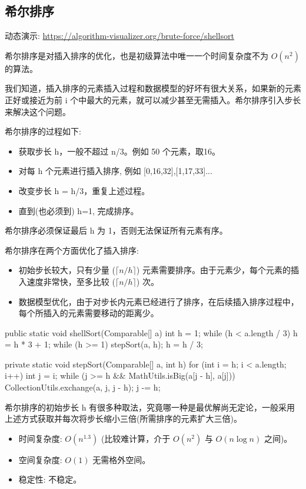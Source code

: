 \subsection{希尔排序}

动态演示: \url{https://algorithm-visualizer.org/brute-force/shellsort}

希尔排序是对插入排序的优化，也是初级算法中唯一一个时间复杂度不为 $O(n^2)$ 的算法。

我们知道，插入排序的元素插入过程和数据模型的好坏有很大关系，如果新的元素正好或接近为前 i 个中最大的元素，就可以减少甚至无需插入。希尔排序引入步长来解决这个问题。

希尔排序的过程如下:
\begin{itemize}
  \item 获取步长 h，一般不超过 n/3。例如 50 个元素，取16。
  \item 对每 h 个元素进行插入排序, 例如 [0,16,32],[1,17,33]... 
  \item 改变步长 h = h/3，重复上述过程。
  \item 直到(也必须到) h=1, 完成排序。
\end{itemize}

希尔排序必须保证最后 h 为 1，否则无法保证所有元素有序。

希尔排序在两个方面优化了插入排序:
\begin{itemize}
  \item 初始步长较大，只有少量 ($\lceil n/h \rceil$) 元素需要排序。由于元素少，每个元素的插入速度非常快，至多比较 ($\lceil n/h \rceil$) 次。
  \item 数据模型优化，由于对步长内元素已经进行了排序，在后续插入排序过程中，每个所插入的元素需要移动的距离少。
\end{itemize}

\begin{Java}
public static void shellSort(Comparable[] a) {
    int h = 1;
    while (h < a.length / 3) h = h * 3 + 1;
    while (h >= 1) {
        stepSort(a, h);
        h = h / 3;
    }
}

private static void stepSort(Comparable[] a, int h) {
    for (int i = h; i < a.length; i++) {
        int j = i;
        while (j >= h && MathUtils.isBig(a[j - h], a[j])) {
            CollectionUtils.exchange(a, j, j - h);
            j -= h;
        }
    }
}
\end{Java}

希尔排序的初始步长 h 有很多种取法，究竟哪一种是最优解尚无定论，一般采用上述方式获取并每次将步长缩小三倍(所需排序的元素扩大三倍)。

\begin{itemize}
  \item 时间复杂度: $O(n^{1.3})$ (比较难计算，介于 $O(n^2)$ 与 $O(n\log n)$ 之间)。
  \item 空间复杂度: $O(1)$ 无需格外空间。
  \item 稳定性: 不稳定。
\end{itemize}